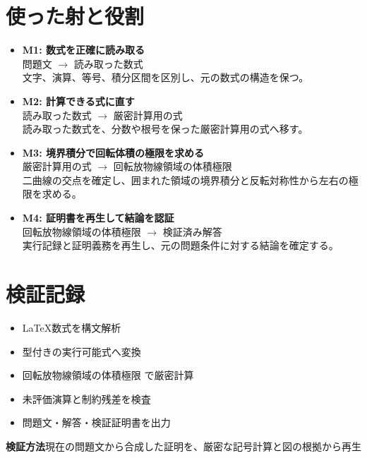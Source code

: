 \documentclass[uplatex,dvipdfmx,11pt]{jsarticle}
\begin{document}
\clearpage
\section*{使った射と役割}
\begin{itemize}
\item \textbf{M1: 数式を正確に読み取る}\\
問題文
$\longrightarrow$
読み取った数式\\
文字、演算、等号、積分区間を区別し、元の数式の構造を保つ。
\item \textbf{M2: 計算できる式に直す}\\
読み取った数式
$\longrightarrow$
厳密計算用の式\\
読み取った数式を、分数や根号を保った厳密計算用の式へ移す。
\item \textbf{M3: 境界積分で回転体積の極限を求める}\\
厳密計算用の式
$\longrightarrow$
回転放物線領域の体積極限\\
二曲線の交点を確定し、囲まれた領域の境界積分と反転対称性から左右の極限を求める。
\item \textbf{M4: 証明書を再生して結論を認証}\\
回転放物線領域の体積極限
$\longrightarrow$
検証済み解答\\
実行記録と証明義務を再生し、元の問題条件に対する結論を確定する。
\end{itemize}




\section*{検証記録}
\begin{itemize}
\item LaTeX数式を構文解析
\item 型付きの実行可能式へ変換
\item 回転放物線領域の体積極限 で厳密計算
\item 未評価演算と制約残差を検査
\item 問題文・解答・検証証明書を出力
\end{itemize}
\noindent\textbf{検証方法}\quad 現在の問題文から合成した証明を、厳密な記号計算と図の根拠から再生
\par{}
\end{document}
